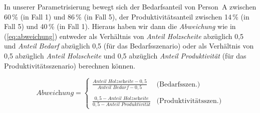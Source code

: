 \documentclass[justified,nobib,nohyper,symmetric,twoside]{tufte-book}
\begin{document}
In unserer Parametrisierung bewegt sich der Bedarfsanteil von Person~A zwischen 60\,\% (in Fall 1) und 86\,\% (in Fall 5), der Produktivitätsanteil zwischen 14\,\% (in Fall 5) und 40\,\% (in Fall 1).
Hieraus haben wir dann die \textit{Abweichung} wie in (\ref{eq:abweichung}) entweder als Verhältnis von \textit{Anteil Holzscheite} abzüglich 0,5 und \textit{Anteil Bedarf} abzüglich 0,5 (für das Bedarfsszenario) oder als Verhältnis von 0,5 abzüglich \textit{Anteil Holzscheite} und 0,5 abzüglich \textit{Anteil Produktivität} (für das Produktivitätsszenario) berechnen können.

\begin{equation}\label{eq:abweichung}
   \textit{Abweichung} = \left\{\begin{array}{ll}\frac{\textit{Anteil Holzscheite}-0,5}{\textit{Anteil Bedarf}-0,5} & \textrm{(Bedarfsszen.)}\\ \\
   \frac{0,5-\textit{Anteil Holzscheite}}{0,5-\textit{Anteil Produktivität}} & \textrm{(Produktivitätsszen.)}
   \end{array}
   \right.
\end{equation}
\end{document}
